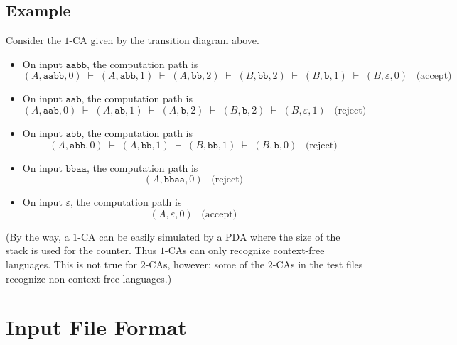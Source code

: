 \documentclass[11pt]{article}
\newcommand{\emptystr}{\varepsilon}
\renewcommand{\t}[1]{\texttt{#1}}
\newcommand{\step}{\;\vdash\;}
\theoremstyle{definition}
\begin{document}
\subsection{Example}
Consider the $1$-CA given by the transition diagram above.
\begin{itemize}
\item
On input $\t{aabb}$, the computation path is
\[ (A,\t{aabb},0) \step (A,\t{abb},1) \step (A,\t{bb},2) \step (B,\t{bb},2) \step (B,\t b,1) \step (B,\emptystr,0) \;\;\;\mbox{(accept)} \]
\item
On input $\t{aab}$, the computation path is
\[ (A,\t{aab},0) \step (A,\t{ab},1) \step (A,\t{b},2) \step (B,\t{b},2) \step (B,\emptystr,1) \;\;\;\mbox{(reject)} \]
\item
On input $\t{abb}$, the computation path is
\[ (A,\t{abb},0) \step (A,\t{bb},1) \step (B,\t{bb},1) \step (B,\t b,0)\;\;\;\mbox{(reject)} \]
\item
On input $\t{bbaa}$, the computation path is
\[ (A,\t{bbaa},0) \;\;\;\mbox{(reject)} \]
\item
On input $\emptystr$, the computation path is
\[ (A,\emptystr,0) \;\;\;\mbox{(accept)} \]
\end{itemize}

(By the way, a $1$-CA can be easily simulated by a PDA where the size of the stack is used for the counter.  Thus $1$-CAs can only recognize context-free languages.  This is not true for $2$-CAs, however; some of the $2$-CAs in the test files recognize non-context-free languages.)

\section{Input File Format}
\end{document}
